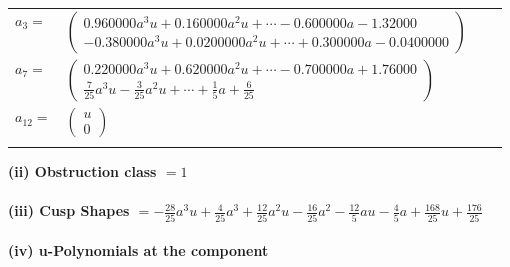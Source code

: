 \documentclass[1p]{elsarticle_modified}
\theoremstyle{definition}
\begin{document}
\begin{tabular}{m{7pt} m{180pt} m{7pt} m{180pt} }
\flushright $a_{3}=$&$\begin{pmatrix}0.960000 a^{3} u+0.160000 a^{2} u+\cdots-0.600000 a-1.32000\\-0.380000 a^{3} u+0.0200000 a^{2} u+\cdots+0.300000 a-0.0400000\end{pmatrix}$ \\
\flushright $a_{7}=$&$\begin{pmatrix}0.220000 a^{3} u+0.620000 a^{2} u+\cdots-0.700000 a+1.76000\\\frac{7}{25} a^3 u-\frac{3}{25} a^2 u+\cdots+\frac{1}{5} a+\frac{6}{25}\end{pmatrix}$ \\
\flushright $a_{12}=$&$\begin{pmatrix}u\\0\end{pmatrix}$\\&\end{tabular}
\flushleft \textbf{(ii) Obstruction class $= 1$}\\~\\
\flushleft \textbf{(iii) Cusp Shapes $= -\frac{28}{25} a^3 u+\frac{4}{25} a^3+\frac{12}{25} a^2 u-\frac{16}{25} a^2-\frac{12}{5} a u-\frac{4}{5} a+\frac{168}{25} u+\frac{176}{25}$}\\~\\
\newpage\renewcommand{\arraystretch}{1}
\flushleft \textbf{(iv) u-Polynomials at the component}\newline \\
\end{document}
